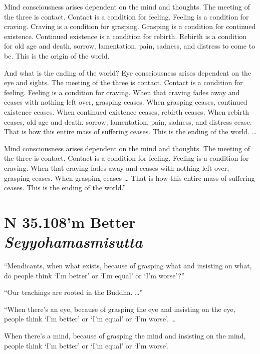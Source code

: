 \documentclass[12pt,openany]{book}%
\newcommand*{\suttatitleacronym}[1]{\smaller[2]{#1}\vspace*{.3em}}
\newcommand*{\suttatitletranslation}[1]{\linebreak{#1}}
\newcommand*{\suttatitleroot}[1]{\linebreak\smaller[2]\itshape{#1}}
\newcommand*{\tocacronym}[1]{\hspace*{-3.3em}{#1}\quad}
\newcommand*{\toctranslation}[1]{#1}
\newcommand*{\tocroot}[1]{(\textit{#1})}
\begin{document}
Mind consciousness arises dependent on the mind and thoughts. The meeting of the three is contact. Contact is a condition for feeling. Feeling is a condition for craving. Craving is a condition for grasping. Grasping is a condition for continued existence. Continued existence is a condition for rebirth. Rebirth is a condition for old age and death, sorrow, lamentation, pain, sadness, and distress to come to be. This is the origin of the world. 

And what is the ending of the world? Eye consciousness arises dependent on the eye and sights. The meeting of the three is contact. Contact is a condition for feeling. Feeling is a condition for craving. When that craving fades away and ceases with nothing left over, grasping ceases. When grasping ceases, continued existence ceases. When continued existence ceases, rebirth ceases. When rebirth ceases, old age and death, sorrow, lamentation, pain, sadness, and distress cease. That is how this entire mass of suffering ceases. This is the ending of the world. … 

Mind consciousness arises dependent on the mind and thoughts. The meeting of the three is contact. Contact is a condition for feeling. Feeling is a condition for craving. When that craving fades away and ceases with nothing left over, grasping ceases. When grasping ceases … That is how this entire mass of suffering ceases. This is the ending of the world.” 

%
\section*{{\suttatitleacronym SN 35.108}{\suttatitletranslation I’m Better }{\suttatitleroot Seyyohamasmisutta}}
\addcontentsline{toc}{section}{\tocacronym{SN 35.108} \toctranslation{I’m Better } \tocroot{Seyyohamasmisutta}}

“Mendicants, when what exists, because of grasping what and insisting on what, do people think ‘I’m better’ or ‘I’m equal’ or ‘I’m worse’?” 

“Our teachings are rooted in the Buddha. …” 

“When there’s an eye, because of grasping the eye and insisting on the eye, people think ‘I’m better’ or ‘I’m equal’ or ‘I’m worse’. … 

When there’s a mind, because of grasping the mind and insisting on the mind, people think ‘I’m better’ or ‘I’m equal’ or ‘I’m worse’. 
\end{document}
